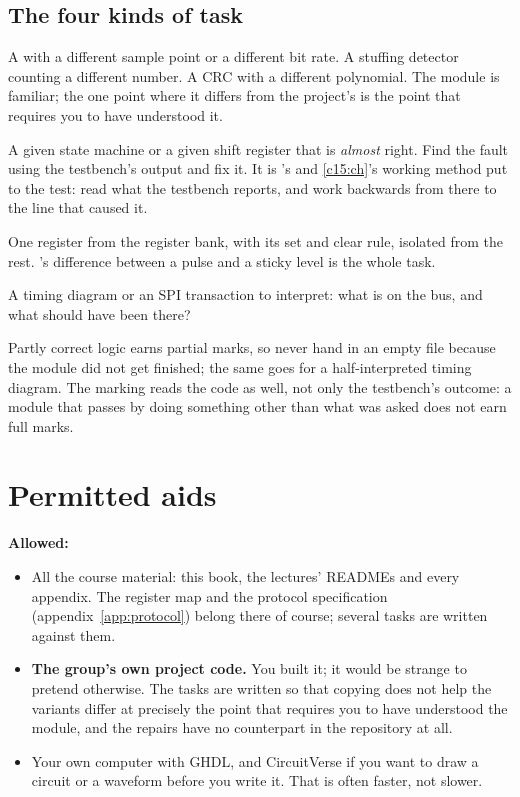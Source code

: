 \subsection*{The four kinds of task}
\begin{description}[style=unboxed,leftmargin=0pt,itemsep=0.8ex]
  \item[Variants.] A  with a different sample point or a different bit rate. A
    stuffing detector counting a different number. A CRC with a different polynomial. The module is
    familiar; the one point where it differs from the project's is the point that requires you to
    have understood it.
  \item[Repairs.] A given state machine or a given shift register that is \emph{almost} right. Find
    the fault using the testbench's output and fix it. It is 's and \ref{c15:ch}'s
    working method put to the test: read what the testbench reports, and work backwards from there to
    the line that caused it.
  \item[A single register.] One register from the register bank, with its set and clear rule, isolated
    from the rest. 's difference between a pulse and a sticky level is the whole
    task.
  \item[Reading.] A timing diagram or an SPI transaction to interpret: what is on the bus, and what
    should have been there?
\end{description}

Partly correct logic earns partial marks, so never hand in an empty file because the module did not
get finished; the same goes for a half-interpreted timing diagram. The marking reads the code as well,
not only the testbench's outcome: a module that passes by doing something other than what was asked
does not earn full marks.

\section{Permitted aids}
\label{c20:sec:aids}

\textbf{Allowed:}
\begin{itemize}
  \item All the course material: this book, the lectures' READMEs and every appendix. The register map
    and the protocol specification (appendix~\ref{app:protocol}) belong there of course; several tasks
    are written against them.
  \item \textbf{The group's own project code.} You built it; it would be strange to pretend
    otherwise. The tasks are written so that copying does not help \textemdash{} the variants differ
    at precisely the point that requires you to have understood the module, and the repairs have no
    counterpart in the repository at all.
  \item Your own computer with GHDL, and CircuitVerse if you want to draw a circuit or a waveform
    before you write it. That is often faster, not slower.
\end{itemize}

